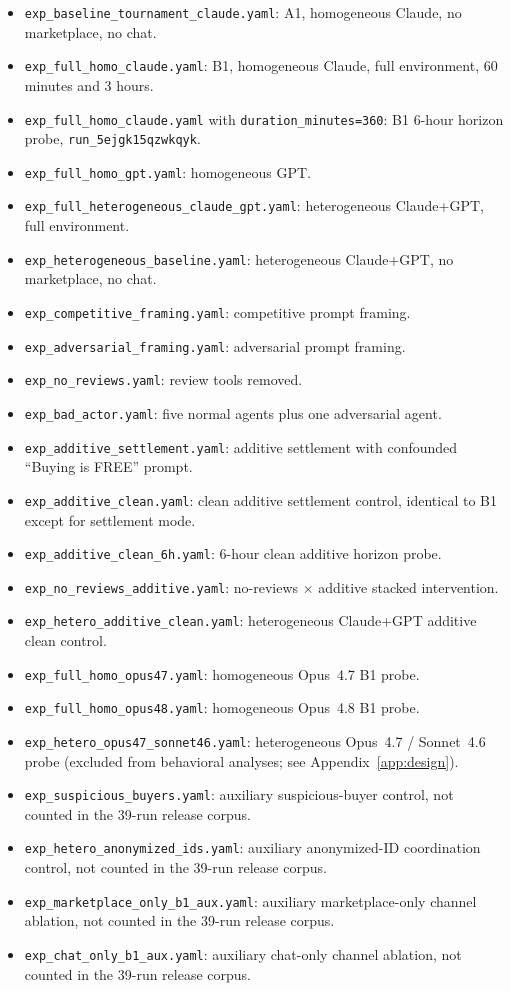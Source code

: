 \documentclass{article}
\begin{document}
\begin{itemize}
    \item \texttt{exp\_baseline\_tournament\_claude.yaml}: A1, homogeneous Claude, no marketplace, no chat.
    \item \texttt{exp\_full\_homo\_claude.yaml}: B1, homogeneous Claude, full environment, 60 minutes and 3 hours.
    \item \texttt{exp\_full\_homo\_claude.yaml} with \texttt{duration\_minutes=360}: B1 6-hour horizon probe, \texttt{run\_5ejgk15qzwkqyk}.
    \item \texttt{exp\_full\_homo\_gpt.yaml}: homogeneous GPT.
    \item \texttt{exp\_full\_heterogeneous\_claude\_gpt.yaml}: heterogeneous Claude+GPT, full environment.
    \item \texttt{exp\_heterogeneous\_baseline.yaml}: heterogeneous Claude+GPT, no marketplace, no chat.
    \item \texttt{exp\_competitive\_framing.yaml}: competitive prompt framing.
    \item \texttt{exp\_adversarial\_framing.yaml}: adversarial prompt framing.
    \item \texttt{exp\_no\_reviews.yaml}: review tools removed.
    \item \texttt{exp\_bad\_actor.yaml}: five normal agents plus one adversarial agent.
    \item \texttt{exp\_additive\_settlement.yaml}: additive settlement with confounded ``Buying is FREE'' prompt.
    \item \texttt{exp\_additive\_clean.yaml}: clean additive settlement control, identical to B1 except for settlement mode.
    \item \texttt{exp\_additive\_clean\_6h.yaml}: 6-hour clean additive horizon probe.
    \item \texttt{exp\_no\_reviews\_additive.yaml}: no-reviews $\times$ additive stacked intervention.
    \item \texttt{exp\_hetero\_additive\_clean.yaml}: heterogeneous Claude+GPT additive clean control.
    \item \texttt{exp\_full\_homo\_opus47.yaml}: homogeneous Opus~4.7 B1 probe.
    \item \texttt{exp\_full\_homo\_opus48.yaml}: homogeneous Opus~4.8 B1 probe.
    \item \texttt{exp\_hetero\_opus47\_sonnet46.yaml}: heterogeneous Opus~4.7 / Sonnet~4.6 probe (excluded from behavioral analyses; see Appendix~\ref{app:design}).
    \item \texttt{exp\_suspicious\_buyers.yaml}: auxiliary suspicious-buyer control, not counted in the 39-run release corpus.
    \item \texttt{exp\_hetero\_anonymized\_ids.yaml}: auxiliary anonymized-ID coordination control, not counted in the 39-run release corpus.
    \item \texttt{exp\_marketplace\_only\_b1\_aux.yaml}: auxiliary marketplace-only channel ablation, not counted in the 39-run release corpus.
    \item \texttt{exp\_chat\_only\_b1\_aux.yaml}: auxiliary chat-only channel ablation, not counted in the 39-run release corpus.
\end{itemize}
\end{document}
